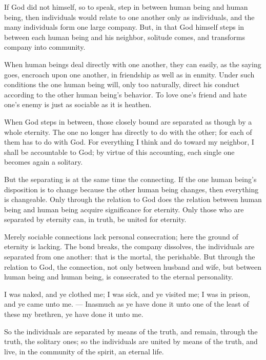 \documentclass[12pt,a4paper]{book}
\begin{document}
If God did not himself, so to speak, step in between human being and human being, then individuals would relate to one another only as individuals, and the many individuals form one large company. But, in that God himself steps in between each human being and his neighbor, solitude comes, and transforms company into community.

When human beings deal directly with one another, they can easily, as the saying goes, encroach upon one another, in friendship as well as in enmity. Under such conditions the one human being will, only too naturally, direct his conduct according to the other human being's behavior. To love one's friend and hate one's enemy is just as sociable as it is heathen.

When God steps in between, those closely bound are separated as though by a whole eternity. The one no longer has directly to do with the other; for each of them has to do with God. For everything I think and do toward my neighbor, I shall be accountable to God; by virtue of this accounting, each single one becomes again a solitary.

But the separating is at the same time the connecting. If the one human being's disposition is to change because the other human being changes, then everything is changeable. Only through the relation to God does the relation between human being and human being acquire significance for eternity. Only those who are separated by eternity can, in truth, be united for eternity.

Merely sociable connections lack personal consecration; here the ground of eternity is lacking. The bond breaks, the company dissolves, the individuals are separated from one another: that is the mortal, the perishable.
But through the relation to God, the connection, not only between husband and wife, but between human being and human being, is consecrated to the eternal personality.

I was naked, and ye clothed me; I was sick, and ye visited me; I was in prison, and ye came unto me. --- Inasmuch as ye have done it unto one of the least of these my brethren, ye have done it unto me.

So the individuals are separated by means of the truth, and remain, through the truth, the solitary ones; so the individuals are united by means of the truth, and live, in the community of the spirit, an eternal life.

\end{document}
